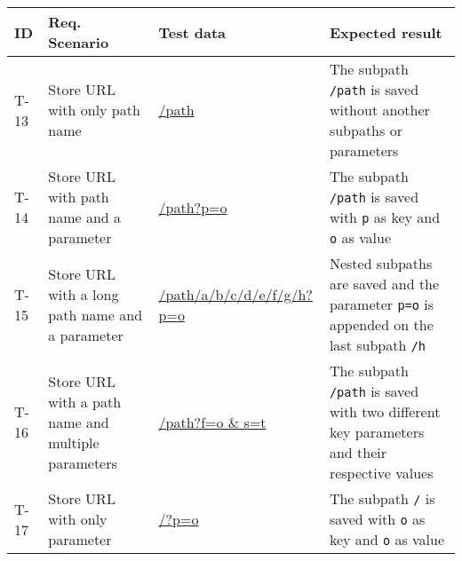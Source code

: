 \begin{tabularx}{\textwidth}{p{} p{} p{} p{}}
  \caption{Test definitions for storing URL}                                                                                                                                                                                                                                                                                                                   \\
  \toprule
  \textbf{ID} & \textbf{Req. Scenario}                             & \textbf{Test data}                    & \textbf{Expected result}                                                                                                                                                                                                                  \\
  \midrule
  T-13        & Store URL with only path name                      & \url{/path}                           & The subpath \texttt{/path} is saved without another subpaths or parameters                                                                                                                                                                \\
  \midrule
  T-14        & Store URL with path name and a parameter           & \url{/path?p=o}                       & The subpath \texttt{/path} is saved with \texttt{p} as key and \texttt{o} as value                                                                                                                                                        \\
  \midrule
  T-15        & Store URL with a long path name and a parameter    & \url{/path/a/b/c/d/e/f/g/h?p=o}       & Nested subpaths are saved and the parameter \texttt{p=o} is appended on the last subpath \texttt{/h}                                                                                                                                      \\
  \midrule
  T-16        & Store URL with a path name and multiple parameters & \url{/path?f=o                        & s=t}                                                                                                                                  & The subpath \texttt{/path} is saved with two different key parameters and their respective values \\
  \midrule
  T-17        & Store URL with only parameter                      & \url{/?p=o}                           & The subpath \texttt{/} is saved with \texttt{o} as key and \texttt{o} as value                                                                                                                                                            \\

\end{tabularx}
